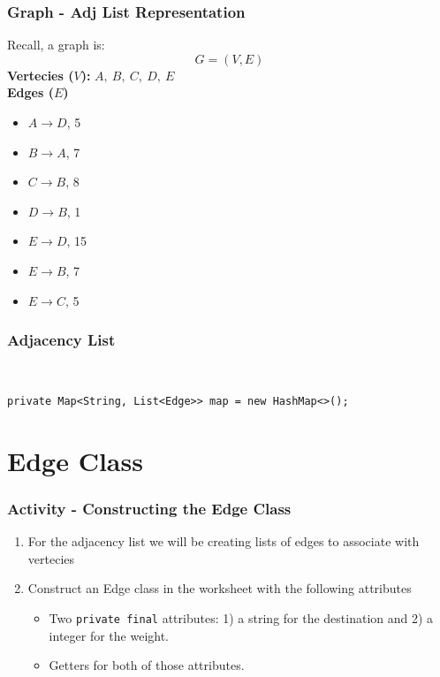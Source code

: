 \documentclass{beamer}
\begin{document}
\begin{frame}[fragile]
    \frametitle{Graph - Adj List Representation}
    \begin{minipage}{0.49\textwidth}
        Recall, a graph is: \[G = (V, E)\]
        \textbf{Vertecies ($V$): }$A,\  B,\ C,\ D,\ E$ \\
        \textbf{Edges ($E$)}
        \begin{itemize}
            \item $ A \rightarrow  D $, 5
            \item $ B \rightarrow  A $, 7
            \item $ C \rightarrow  B $, 8
            \item $ D \rightarrow  B $, 1
            \item $ E \rightarrow  D $, 15
            \item $ E \rightarrow  B $, 7
            \item $ E \rightarrow  C $, 5
        \end{itemize}
    \end{minipage}
    \begin{minipage}{0.49\textwidth}
    \resizebox{\textwidth}{!}{
        
    }
\end{minipage}
\end{frame}

\begin{frame}[fragile]
    \frametitle{Adjacency List}
    \centering
    \resizebox{0.49\textwidth}{!}{
        
    }
    \vfill\\
    \hspace{1.5cm}
    \begin{minipage}{0.70\textwidth}
    \begin{lstlisting}[basicstyle=\tiny, frame=trBL]
    private Map<String, List<Edge>> map = new HashMap<>();
    \end{lstlisting}
    \end{minipage}
\end{frame}

\section{Edge Class}

\begin{frame}[fragile]
    \frametitle{Activity - Constructing the Edge Class}
    \begin{enumerate}
        \item For the adjacency list we will be creating lists of edges to associate with vertecies
        \item Construct an Edge class in the worksheet with the following attributes
            \begin{itemize}
                \item Two \lstinline|private final| attributes: 1) a string for the destination and 2) a integer for the weight.
                \item Getters for both of those attributes.
            \end{itemize}
    \end{enumerate}
\end{frame}
\end{document}
